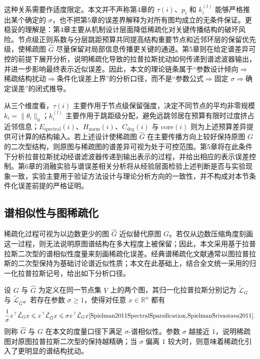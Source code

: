 这种关系需要作适度限定。本文并不声称第4章的 $\tau(i)$、$p_l$ 和 $k_i^{(l)}$ 能够严格推出某个确定的 $\sigma$，也不把第5章的误差界解释为对所有图均成立的无条件保证。更稳妥的理解是：第4章主要从机制设计层面降低稀疏化对关键传播结构的破坏风险。节点级正则系数与分层跳距预算共同提高结构重要节点和近邻环层的保留优先级，使稀疏图 $\hat{G}$ 尽量保留对局部信息传播更关键的通道。第5章则在给定谱差异可控的前提下展开分析，说明稀疏化导致的拉普拉斯扰动如何传递到谱滤波器输出，并进一步影响最终表示近似误差。因此，本文的理论链条属于“参数设计倾向\(\Rightarrow\)稀疏结构扰动\(\Rightarrow\)条件化误差上界”的分析口径，而不是“参数公式\(\Rightarrow\)固定 $\sigma$\(\Rightarrow\)确定误差”的闭式推导。

从三个维度看，$\tau(i)$ 主要作用于节点级保留强度，决定不同节点的平均非零规模 $k_i=\|\theta_i\|_0$；$k_i^{(l)}$ 主要作用于跳距级分配，避免远跳邻居在预算有限时过度挤占近邻信息；$E_{\mathrm{spectral}}(i)$、$H_{\mathrm{norm}}(i)$、$C_{\mathrm{deg}}(i)$ 与 $\mathrm{core}(i)$ 则为上述预算差异提供可计算的结构输入。若上述设计使稀疏图 $\hat{G}$ 在主要传播方向上较好保持原图 $G$ 的二次型结构，则原图与稀疏图的谱差异可视为处于可控范围。第5章将在此条件下分析拉普拉斯扰动经谱滤波器传递到输出表示的过程，并给出相应的表示误差控制。第6章的消融实验与谱误差相关分析将从经验层面检验上述判断是否与实验现象一致，实验主要用于验证方法设计与理论分析方向的一致性，并不构成对本节条件化误差前提的严格证明。

\subsection{谱相似性与图稀疏化}
\label{subsec:ch5-spectralsim}
\label{idx:theme:spectralsim}
稀疏化过程可视为以边数更少的图 $\hat{G}$ 近似替代原图 $G$。若仅从边数压缩角度刻画这一过程，则无法说明原图谱结构在多大程度上被保留；因此，本文采用基于拉普拉斯二次型的谱相似性度量来刻画稀疏化误差。经典谱稀疏化文献通常以图拉普拉斯的二次型保持为基础讨论谱近似性质\cite{Spielman2011EffectiveResistances,Spielman2011SpectralSparsification}；本文在此基础上，结合全文统一采用的归一化拉普拉斯记号，给出如下分析口径。

设 $G$ 与 $\hat{G}$ 为定义在同一节点集 $V$ 上的两个图，其归一化拉普拉斯分别记为 $\tilde{\mathcal{L}}_{G}$ 与 $\tilde{\mathcal{L}}_{\hat{G}}$。若存在参数 $\sigma\ge 1$，使得对任意 $x\in\mathbb{R}^{n}$ 都有
\begin{equation}
  \frac{1}{\sigma}x^\top \tilde{\mathcal{L}}_{G}x
  \le
  x^\top \tilde{\mathcal{L}}_{\hat{G}}x
  \le
  \sigma x^\top \tilde{\mathcal{L}}_{G}x \text{\cite{Spielman2011SpectralSparsification,SpielmanSrivastava2011}}.
  \label{eq:ch5-sigma-sim}
\end{equation}
则称 $\hat{G}$ 与 $G$ 在本文的度量口径下满足 $\sigma$-谱相似性。参数 $\sigma$ 越接近 $1$，说明稀疏图对原图拉普拉斯二次型的保持越精确；当 $\sigma$ 偏离 $1$ 较大时，则意味着稀疏化引入了更明显的谱结构扰动。

